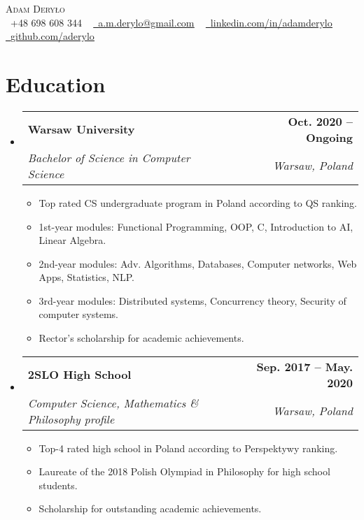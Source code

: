 \documentclass[letterpaper,11pt]{article}
\makeatletter
\newcommand{\resumeItem}[1]{
  \item\small{
    {#1 \vspace{-2pt}}
  }
}
\newcommand{\resumeSubheading}[4]{
  \vspace{-2pt}\item
    \begin{tabular*}{1.0\textwidth}[t]{l@{\extracolsep{\fill}}r}
      \textbf{#1} & \textbf{\small #2} \\
      \textit{\small#3} & \textit{\small #4} \\
    \end{tabular*}\vspace{-7pt}
}
\newcommand{\resumeSubHeadingListStart}{\begin{itemize}[leftmargin=0.0in, label={}]}
\newcommand{\resumeSubHeadingListEnd}{\end{itemize}}
\newcommand{\resumeItemListStart}{\begin{itemize}}
\newcommand{\resumeItemListEnd}{\end{itemize}\vspace{-5pt}}
\makeatother
\begin{document}

\begin{center}
  {\Huge \scshape Adam Deryło} \\ \vspace{4pt}
  \small \raisebox{-0.1\height}\faPhone\ +48 698 608 344 ~ \href{mailto:a.m.derylo@gmail.com}{\raisebox{-0.2\height}\faEnvelope\  \underline{a.m.derylo@gmail.com}} ~
  \href{https://linkedin.com/in//adamderylo}{\raisebox{-0.2\height}\faLinkedin\ \underline{linkedin.com/in/adamderylo}}  ~
  \href{https://github.com/aderylo}{\raisebox{-0.2\height}\faGithub\ \underline{github.com/aderylo}}
\end{center}


\section{Education}
\resumeSubHeadingListStart
\resumeSubheading
{Warsaw University}{Oct. 2020 -- Ongoing}
{Bachelor of Science in Computer Science}{Warsaw, Poland}
\resumeItemListStart
\resumeItem{Top rated CS undergraduate program in Poland according to QS ranking.}
\resumeItem{1st-year modules: Functional Programming, OOP, C, Introduction to AI, Linear Algebra.}
\resumeItem{2nd-year modules: Adv. Algorithms, Databases, Computer networks, Web Apps, Statistics, NLP.}
\resumeItem{3rd-year modules: Distributed systems, Concurrency theory,  Security of computer systems.}
\resumeItem{Rector's scholarship for academic achievements.}

\resumeItemListEnd

\resumeSubheading
{2SLO High School}{Sep. 2017 -- May. 2020}
{Computer Science, Mathematics \& Philosophy profile}{Warsaw, Poland}
\resumeItemListStart
\resumeItem{Top-4 rated high school in Poland according to Perspektywy ranking.}
\resumeItem{Laureate of the 2018 Polish Olympiad in Philosophy for high school students.}
\resumeItem{Scholarship for outstanding academic achievements.}
\resumeItemListEnd
\resumeSubHeadingListEnd
\vspace{-16pt}
\end{document}
